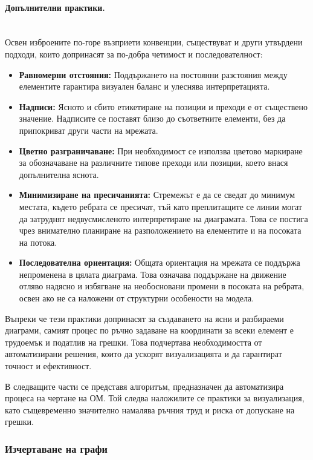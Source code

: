 \paragraph{Допълнителни практики.}
\mbox{}\\
Освен изброените по-горе възприети конвенции, съществуват и други утвърдени подходи, които допринасят за по-добра четимост и последователност:

\begin{itemize} \item \textbf{Равномерни отстояния:} Поддържането на постоянни разстояния между елементите гарантира визуален баланс и улеснява интерпретацията. \item \textbf{Надписи:} Ясното и сбито етикетиране на позиции и преходи е от съществено значение. Надписите се поставят близо до съответните елементи, без да припокриват други части на мрежата. \item \textbf{Цветно разграничаване:} При необходимост се използва цветово маркиране за обозначаване на различните типове преходи или позиции, което внася допълнителна яснота. \item \textbf{Минимизиране на пресичанията:} Стремежът е да се сведат до минимум местата, където ребрата се пресичат, тъй като преплитащите се линии могат да затруднят недвусмисленото интерпретиране на диаграмата. Това се постига чрез внимателно планиране на разположението на елементите и на посоката на потока. \item \textbf{Последователна ориентация:} Общата ориентация на мрежата се поддържа непроменена в цялата диаграма. Това означава поддържане на движение отляво надясно и избягване на необосновани промени в посоката на ребрата, освен ако не са наложени от структурни особености на модела. \end{itemize}

Въпреки че тези практики допринасят за създаването на ясни и разбираеми диаграми, самият процес по ръчно задаване на координати за всеки елемент е трудоемък и податлив на грешки. Това подчертава необходимостта от автоматизирани решения, които да ускорят визуализацията и да гарантират точност и ефективност.

В следващите части се представя алгоритъм, предназначен да автоматизира процеса на чертане на ОМ. Той следва наложилите се практики за визуализация, като същевременно значително намалява ръчния труд и риска от допускане на грешки.

\subsubsection{Изчертаване на графи}

